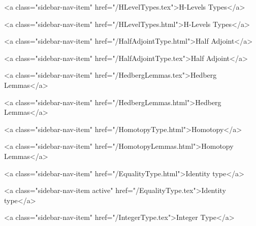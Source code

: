       
        
          <a class="sidebar-nav-item" href="/HLevelTypes.tex">H-Levels Types</a>
        
      
    
      
        
          <a class="sidebar-nav-item" href="/HLevelTypes.html">H-Levels Types</a>
        
      
    
      
        
          <a class="sidebar-nav-item" href="/HalfAdjointType.html">Half Adjoint</a>
        
      
    
      
        
          <a class="sidebar-nav-item" href="/HalfAdjointType.tex">Half Adjoint</a>
        
      
    
      
        
          <a class="sidebar-nav-item" href="/HedbergLemmas.tex">Hedberg Lemmas</a>
        
      
    
      
        
          <a class="sidebar-nav-item" href="/HedbergLemmas.html">Hedberg Lemmas</a>
        
      
    
      
        
          <a class="sidebar-nav-item" href="/HomotopyType.html">Homotopy</a>
        
      
    
      
        
          <a class="sidebar-nav-item" href="/HomotopyLemmas.html">Homotopy Lemmas</a>
        
      
    
      
        
          <a class="sidebar-nav-item" href="/EqualityType.html">Identity type</a>
        
      
    
      
        
          <a class="sidebar-nav-item active" href="/EqualityType.tex">Identity type</a>
        
      
    
      
        
          <a class="sidebar-nav-item" href="/IntegerType.tex">Integer Type</a>
        
      
    
